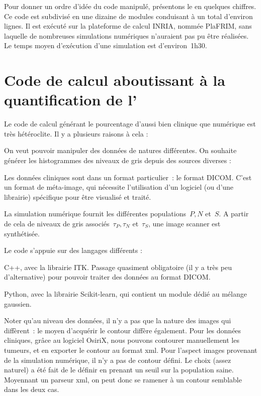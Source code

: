 \documentclass[main.tex]{subfiles}
\begin{document}
Pour donner un ordre d'idée du code manipulé, présentons le en quelques chiffres. Ce code est subdivisé en une dizaine de modules conduisant à un total d'environ  lignes. Il est exécuté sur la plateforme de calcul INRIA, nommée PlaFRIM, sans laquelle de nombreuses simulations numériques n'auraient pas pu être réalisées. Le temps moyen d'exécution d'une simulation est d'environ~1h30. 


\section{Code de calcul aboutissant à la quantification de l'\hetero}
Le code de calcul générant le pourcentage d'\hetero aussi bien clinique que numérique est très hétéroclite. Il y a plusieurs raisons à cela :
\begin{myitemize}
\item On veut pouvoir manipuler des données de natures différentes. On souhaite générer les histogrammes des niveaux de gris depuis des sources diverses :
\begin{myitemize}[label=$-$]
\item Les données cliniques sont dans un format particulier~: le format DICOM. C'est un format de méta-image, qui nécessite l'utilisation d'un logiciel (ou d'une librairie) spécifique pour être visualisé et traité. 
\item La simulation numérique fournit les différentes populations~$P,N$ et~$S$. A partir de cela  de niveaux de gris associés~$\tau_P, \tau_N$ et~$\tau_S$, une image scanner est synthétisée.
\end{myitemize}
\item Le code s'appuie sur des langages différents :
\begin{myitemize}[label=$-$]
\item C++, avec la librairie ITK. Passage quasiment obligatoire (il y a très peu d'alternative) pour pouvoir traiter des données au format DICOM.
\item Python, avec la librairie Scikit-learn, qui contient un module dédié au mélange gaussien.
\end{myitemize}
\end{myitemize}

Noter qu'au niveau des données, il n'y a pas que la nature des images qui diffèrent~: le moyen d'acquérir le contour diffère également. 
Pour les données cliniques, grâce au logiciel OsiriX, nous pouvons contourer manuellement les tumeurs, et en exporter le contour au format xml. Pour l'aspect images provenant de la simulation numérique, il n'y a pas de contour défini. Le choix (assez naturel) a été fait de le définir en prenant un seuil sur la population saine. Moyennant un parseur xml, on peut donc se ramener à un contour semblable dans les deux cas.
\end{document}
